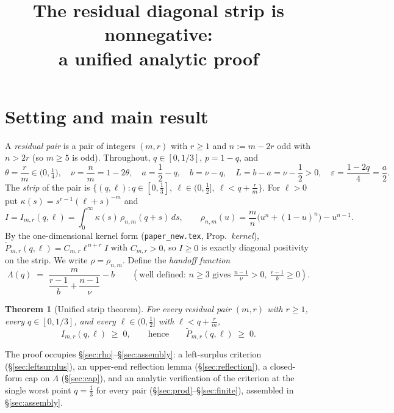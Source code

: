 \documentclass[11pt]{amsart}
\title[The residual strip, unified]{The residual diagonal strip is nonnegative:\\ a unified analytic proof}
\newtheorem{theorem}{Theorem}
\theoremstyle{remark}
\newcommand{\wtP}{\widetilde P}
\begin{document}
\maketitle

\section{Setting and main result}\label{sec:setting}

A \emph{residual pair} is a pair of integers $(m,r)$ with $r\ge1$ and $n:=m-2r$ odd with $n>2r$ (so $m\ge5$ is odd).  Throughout, $q\in[0,1/3]$, $p=1-q$, and
\[
        \theta=\frac rm\in\bigl(0,\tfrac14\bigr),\quad
        \nu=\frac nm=1-2\theta,\quad
        a=\frac12-q,\quad
        b=\nu-q,\quad
        L=b-a=\nu-\frac12>0,\quad
        \varepsilon=\frac{1-2q}{4}=\frac a2 .
\]
The \emph{strip} of the pair is $\{(q,\ell):q\in[0,\tfrac13],\ \ell\in(0,\tfrac12],\ \ell<q+\tfrac rm\}$.  For $\ell>0$ put $\kappa(s)=s^{r-1}(\ell+s)^{-m}$ and
\[
        I=I_{m,r}(q,\ell)
        =\int_0^\infty \kappa(s)\,\rho_{n,m}(q+s)\,ds,
        \qquad
        \rho_{n,m}(u)=\frac mn\bigl(u^n+(1-u)^n\bigr)-u^{n-1}.
\]
By the one-dimensional kernel form (\texttt{paper\_new.tex}, Prop.~\emph{kernel}), $\wtP_{m,r}(q,\ell)=C_{m,r}\ell^{\,n+r}I$ with $C_{m,r}>0$, so $I\ge0$ is exactly diagonal positivity on the strip.  We write $\rho=\rho_{n,m}$.  Define the \emph{handoff function}
\begin{equation}\label{eq:Lambda}
        \Lambda(q)\;=\;\frac{m}{\dfrac{r-1}{b}+\dfrac{n-1}{\nu}}-b
        \qquad(\text{well defined: }n\ge3\text{ gives }\tfrac{n-1}\nu>0,\ \tfrac{r-1}b\ge0).
\end{equation}

\begin{theorem}[Unified strip theorem]\label{thm:main}
For every residual pair $(m,r)$ with $r\ge1$, every $q\in[0,1/3]$, and every $\ell\in(0,\tfrac12]$ with $\ell<q+\tfrac rm$,
\[
        I_{m,r}(q,\ell)\;\ge\;0,
        \qquad\text{hence}\qquad
        \wtP_{m,r}(q,\ell)\;\ge\;0 .
\]
\end{theorem}

The proof occupies \S\ref{sec:rho}--\S\ref{sec:assembly}: a left-surplus criterion (\S\ref{sec:leftsurplus}), an upper-end reflection lemma (\S\ref{sec:reflection}), a closed-form cap on $\Lambda$ (\S\ref{sec:cap}), and an analytic verification of the criterion at the single worst point $q=\tfrac13$ for every pair (\S\ref{sec:prod}--\S\ref{sec:finite}), assembled in \S\ref{sec:assembly}.
\end{document}
